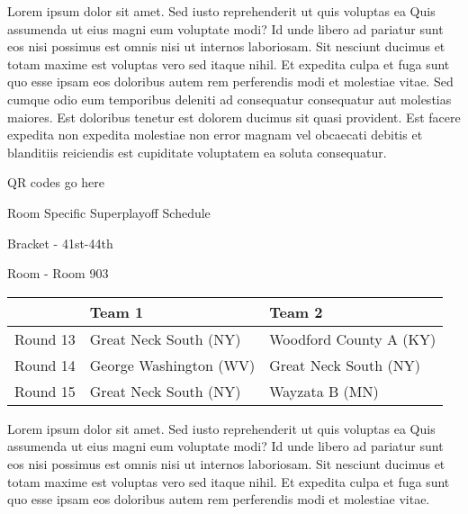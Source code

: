 \documentclass{article}%
\begin{document}
Lorem ipsum dolor sit amet. Sed iusto reprehenderit ut quis voluptas ea Quis assumenda ut eius magni eum voluptate modi? Id unde libero ad pariatur sunt eos nisi possimus est omnis nisi ut internos laboriosam. Sit nesciunt ducimus et totam maxime est voluptas vero sed itaque nihil. Et expedita culpa et fuga sunt quo esse ipsam eos doloribus autem rem perferendis modi et molestiae vitae.\newline%
\newline%
Sed cumque odio eum temporibus deleniti ad consequatur consequatur aut molestias maiores. Est doloribus tenetur est dolorem ducimus sit quasi provident. Est facere expedita non expedita molestiae non error magnam vel obcaecati debitis et blanditiis reiciendis est cupiditate voluptatem ea soluta consequatur.%
\vspace*{140pt}%
\begin{center}%
\begin{Huge}%
QR codes go here%
\end{Huge}%
\end{center}%
\newpage%
\begin{center}%
\begin{Huge}%
Room Specific Superplayoff Schedule%
\end{Huge}%
\vspace*{8pt}%
\linebreak%
\begin{Large}%
Bracket {-} 41st{-}44th%
\end{Large}%
\vspace*{8pt}%
\linebreak%
\vspace*{8pt}%
\begin{Large}%
Room {-} Room 903%
\end{Large}%
\end{center}%
%
\begin{tabularx}{\textwidth}{|c|Y|Y|}%
\hline%
&Team 1&Team 2\\%
\hline%
Round 13&Great Neck South (NY)&Woodford County A (KY)\\%
Round 14&George Washington (WV)&Great Neck South (NY)\\%
Round 15&Great Neck South (NY)&Wayzata B (MN)\\%
\hline%
\end{tabularx}%
\vspace*{8pt}%
\newline%
Lorem ipsum dolor sit amet. Sed iusto reprehenderit ut quis voluptas ea Quis assumenda ut eius magni eum voluptate modi? Id unde libero ad pariatur sunt eos nisi possimus est omnis nisi ut internos laboriosam. Sit nesciunt ducimus et totam maxime est voluptas vero sed itaque nihil. Et expedita culpa et fuga sunt quo esse ipsam eos doloribus autem rem perferendis modi et molestiae vitae.\newline%
\end{document}
